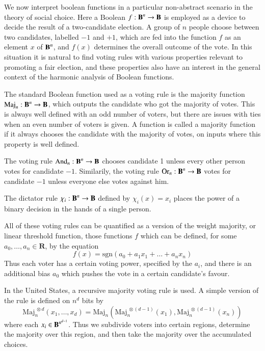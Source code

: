We now interpret boolean functions in a particular non-abstract scenario in the theory of social choice. Here a Boolean $f: \operatorname{\mathbf{B}}^n \to \operatorname{\mathbf{B}}$ is employed as a device to decide the result of a two-candidate election. A group of $n$ people choose between two candidates, labelled $-1$ and $+1$, which are fed into the function $f$ as an element $x$ of $\operatorname{\mathbf{B}}^n$, and $f(x)$ determines the overall outcome of the vote. In this situation it is natural to find voting rules with various properties relevant to promoting a fair election, and these properties also have an interest in the general context of the harmonic analysis of Boolean functions.

\begin{example}
    The standard Boolean function used as a voting rule is the majority function $\text{Maj}_n: \operatorname{\mathbf{B}}^n \to \operatorname{\mathbf{B}}$, which outputs the candidate who got the majority of votes. This is always well defined with an odd number of voters, but there are issues with ties when an even number of voters is given. A function is called a majority function if it always chooses the candidate with the majority of votes, on inputs where this property is well defined.
\end{example}

\begin{example}
    The voting rule $\text{And}_n: \operatorname{\mathbf{B}}^n \to \operatorname{\mathbf{B}}$ chooses candidate 1 unless every other person votes for candidate $-1$. Similarily, the voting rule $\text{Or}_n: \operatorname{\mathbf{B}}^n \to \operatorname{\mathbf{B}}$ votes for candidate $-1$ unless everyone else votes against him.
\end{example}

\begin{example}
    The dictator rule $\chi_i: \operatorname{\mathbf{B}}^n \to \operatorname{\mathbf{B}}$ defined by $\chi_i(x) = x_i$ places the power of a binary decision in the hands of a single person.
\end{example}

\begin{example}
    All of these voting rules can be quantified as a version of the weight majority, or linear threshold function, those functions $f$ which can be defined, for some $a_0, \dots, a_n \in \mathbf{R}$, by the equation
    \[ f(x) = \text{sgn}(a_0 + a_1x_1 + \dots + a_nx_n) \]
    Thus each voter has a certain voting power, specified by the $a_i$, and there is an additional bias $a_0$ which pushes the vote in a certain candidate's favour.
\end{example}

\begin{example}
    In the United States, a recursive majority voting rule is used. A simple version of the rule is defined on $n^d$ bits by
    \[ \text{Maj}_n^{\ \otimes d}(x_1, \dots, x_d) = \text{Maj}_n(\text{Maj}^{\ \otimes (d-1)}_n(x_1), \text{Maj}^{\ \otimes (d-1)}_n(x_n)) \]
    where each $x_i \in \operatorname{\mathbf{B}}^{n^{d-1}}$. Thus we subdivide voters into certain regions, determine the majority over this region, and then take the majority over the accumulated choices.
\end{example}

